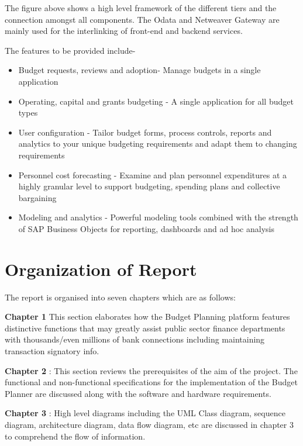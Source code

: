         The figure above shows a high level framework of the different tiers and the connection
        amongst all components. The Odata and Netweaver Gateway are mainly used for the
        interlinking of front-end and backend services.
    
    
        The features to be provided include-
    
        \begin{itemize}
            \item Budget requests, reviews and adoption- Manage budgets in a single application
    
            \item Operating, capital and grants budgeting - A single application for all budget types
    
            \item User configuration - Tailor budget forms, process controls, reports and analytics to your unique budgeting requirements and adapt them to changing requirements
            \item Personnel cost forecasting - Examine and plan personnel expenditures at a highly granular level to support budgeting, spending plans and collective bargaining
            \item Modeling and analytics - Powerful modeling tools combined with the strength of SAP Business Objects for reporting, dashboards and ad hoc analysis
    
    \end{itemize}
    
    
\section{Organization of Report}
The report is organised into seven chapters which are as follows:

{\bf Chapter 1} This section elaborates how the Budget Planning platform features distinctive functions
that may greatly assist public sector finance departments with thousands/even millions of
bank connections including maintaining transaction signatory info.

{\bf Chapter 2} : This section reviews the prerequisites of the aim of the project. The functional
and non-functional specifications for the implementation of the Budget Planner are discussed along
with the software and hardware requirements.

{\bf Chapter 3} : High level diagrams including the UML Class diagram, sequence diagram,
architecture diagram, data flow diagram, etc are discussed in chapter 3 to comprehend the
flow of information.

